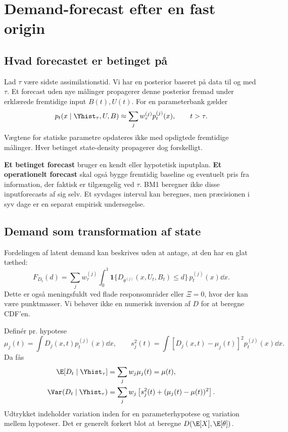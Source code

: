 \section{Demand-forecast efter en fast origin}
\subsection{Hvad forecastet er betinget på}
Lad \(\tau\) være sidste assimilationstid. Vi har en posterior baseret på data til og med \(\tau\). Et forecast uden nye målinger propagerer denne posterior fremad under erklærede fremtidige input \(B(t),U(t)\). For en parameterbank gælder
\begin{equation}
 p_t(x\mid\Yhist_\tau,U,B)\approx\sum_jw_\tau^{(j)}p_t^{(j)}(x),\qquad t>\tau.
 \label{eq:forecaststate}
\end{equation}
Vægtene for statiske parametre opdateres ikke med opdigtede fremtidige målinger. Hver betinget state-density propagerer dog forskelligt.

\textbf{Et betinget forecast} bruger en kendt eller hypotetisk inputplan. \textbf{Et operationelt forecast} skal også bygge fremtidig baseline og eventuelt pris fra information, der faktisk er tilgængelig ved \(\tau\). BM1 beregner ikke disse inputforecasts af sig selv. Et syvdages interval kan beregnes, men præcisionen i syv dage er en separat empirisk undersøgelse.

\subsection{Demand som transformation af state}
Fordelingen af latent demand kan beskrives uden at antage, at den har en glat tæthed:
\begin{equation}
 F_{D_t}(d)=\sum_jw_\tau^{(j)}\int_0^1
 \bm1\{D_{\theta^{(j)}}(x,U_t,B_t)\leq d\}\,p_t^{(j)}(x)\dd x.
 \label{eq:demandcdf}
\end{equation}
Dette er også meningsfuldt ved flade responsområder eller \(\Xi=0\), hvor der kan være punktmasser. Vi behøver ikke en numerisk inversion af \(D\) for at beregne CDF'en.

Definér pr. hypotese
\[
 \mu_j(t)=\int D_j(x,t)p_t^{(j)}(x)\dd x,\qquad
 s_j^2(t)=\int [D_j(x,t)-\mu_j(t)]^2p_t^{(j)}(x)\dd x.
\]
Da fås
\begin{align}
 \E[D_t\mid\Yhist_\tau]&=\sum_jw_j\mu_j(t)=\mu(t),\label{eq:forecastmean}\\
 \Var(D_t\mid\Yhist_\tau)&=\sum_jw_j\left[s_j^2(t)+(\mu_j(t)-\mu(t))^2\right].
 \label{eq:forecastvariance}
\end{align}
Udtrykket indeholder variation inden for en parameterhypotese og variation mellem hypoteser. Det er generelt forkert blot at beregne \(D(\E[X],\E[\theta])\).

